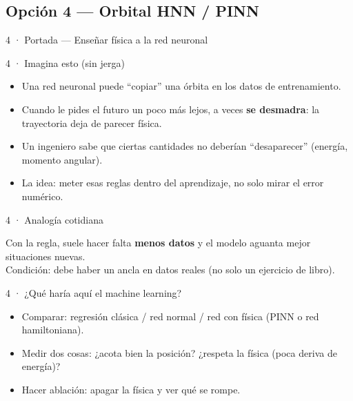 \subsection{Opción 4 --- Orbital HNN / PINN}

\begin{frame}{4 · Portada --- Enseñar física a la red neuronal}
\end{frame}

\begin{frame}{4 · Imagina esto (sin jerga)}
  \begin{itemize}
    \item Una red neuronal puede ``copiar'' una órbita en los datos de entrenamiento.
    \item Cuando le pides el futuro un poco más lejos, a veces \textbf{se desmadra}: la trayectoria deja de parecer física.
    \item Un ingeniero sabe que ciertas cantidades no deberían ``desaparecer'' (energía, momento angular).
    \item La idea: meter esas reglas dentro del aprendizaje, no solo mirar el error numérico.
  \end{itemize}
\end{frame}

\begin{frame}{4 · Analogía cotidiana}
  \begin{center}
  \end{center}
  \vspace{0.4em}
  Con la regla, suele hacer falta \textbf{menos datos} y el modelo aguanta mejor situaciones nuevas.\\
  Condición: debe haber un ancla en datos reales (no solo un ejercicio de libro).
\end{frame}

\begin{frame}{4 · ¿Qué haría aquí el machine learning?}
  \begin{itemize}
    \item Comparar: regresión clásica / red normal / red con física (PINN o red hamiltoniana).
    \item Medir dos cosas: ¿acota bien la posición? ¿respeta la física (poca deriva de energía)?
    \item Hacer ablación: apagar la física y ver qué se rompe.
  \end{itemize}
\end{frame}


